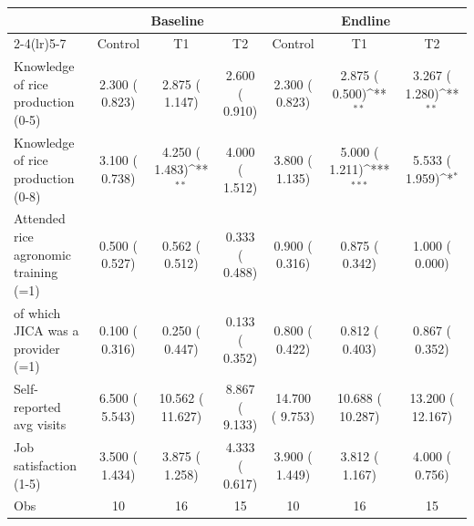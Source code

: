 \def\sym#1{\ifmmode^{#1}\else\(^{#1}\)\fi}
\begin{tabular}{lcccccc}
\toprule
 & \multicolumn{3}{c}{Baseline} & \multicolumn{3}{c}{Endline} \\
\cmidrule(lr){2-4}\cmidrule(lr){5-7}
 & Control & T1 & T2 & Control & T1 & T2 \\
\midrule
Knowledge of rice production (0-5) &     2.300 (    0.823) &     2.875 (    1.147) &     2.600 (    0.910) &     2.300 (    0.823) &     2.875 (    0.500)\sym{**} &     3.267 (    1.280)\sym{**} \\
Knowledge of rice production (0-8) &     3.100 (    0.738) &     4.250 (    1.483)\sym{**} &     4.000 (    1.512) &     3.800 (    1.135) &     5.000 (    1.211)\sym{***} &     5.533 (    1.959)\sym{*} \\
Attended rice agronomic training (=1) &     0.500 (    0.527) &     0.562 (    0.512) &     0.333 (    0.488) &     0.900 (    0.316) &     0.875 (    0.342) &     1.000 (    0.000) \\
\quad of which JICA was a provider (=1) &     0.100 (    0.316) &     0.250 (    0.447) &     0.133 (    0.352) &     0.800 (    0.422) &     0.812 (    0.403) &     0.867 (    0.352) \\
Self-reported avg visits &     6.500 (    5.543) &    10.562 (   11.627) &     8.867 (    9.133) &    14.700 (    9.753) &    10.688 (   10.287) &    13.200 (   12.167) \\
Job satisfaction (1-5) &     3.500 (    1.434) &     3.875 (    1.258) &     4.333 (    0.617) &     3.900 (    1.449) &     3.812 (    1.167) &     4.000 (    0.756) \\
\midrule
Obs &        10 &        16 &        15 &        10 &        16 &        15 \\
\bottomrule
\end{tabular}
